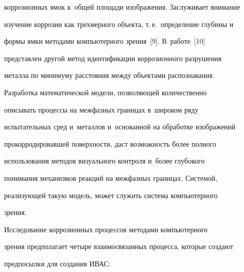 коррозионных ямок к~общей площади изображения. Заслуживает внимание 


изучение коррозии как трехмерного объекта, т.\,е.\ определение глубины и~


формы ямки методами компьютерного зрения~[9]. В~работе~[10] 


представлен другой метод идентификации коррозионного разрушения 


металла по минимуму расстояния между объектами распознавания.


   


   Разработка математической модели, позволяющей количественно 


описывать процессы на межфазных границах в~широком ряду 


испытательных сред и~металлов и~основанной на обработке изображений 


прокорродировавшей поверхности, даст возможность более полного 


использования методов визуального контроля и~более глубокого 


понимания механизмов реакций на межфазных границах. Системой, 


реализующей такую модель, может служить система компьютерного 


зрения.


   


   Исследование коррозионных процессов методами компьютерного 


зрения предполагает четыре взаимосвязанных процесса, которые создают 


предпосылки для создания ИВАС:


